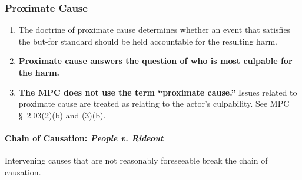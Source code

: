 \subsubsection{Proximate Cause} 

\begin{enumerate}
    \item The doctrine of proximate cause determines whether an event that 
    satisfies the but-for standard should be held accountable for the 
    resulting harm.
    \item \textbf{Proximate cause answers the question of who is most culpable 
    for the harm.}
    \item \textbf{The MPC does not use the term ``proximate cause.''} Issues 
    related to proximate cause are treated as relating to the actor's 
    culpability. See MPC \S\ 2.03(2)(b) and (3)(b).
\end{enumerate}

\paragraph{Chain of Causation: \emph{People v. Rideout}}

Intervening causes that are not reasonably foreseeable break the chain of 
causation.

